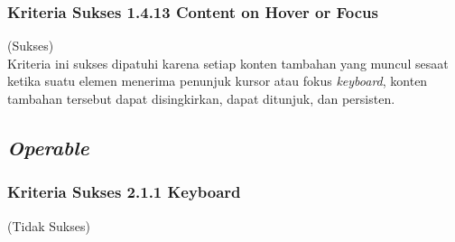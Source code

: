 \documentclass[a4paper,twoside]{article}
\begin{document}
\begin{enumerate}
		\subsubsection*{Kriteria Sukses 1.4.13 Content on Hover or Focus}
		\label{subsubsec:kepatuhan_kriteria_1.4.13}
		(Sukses) \\
		
		Kriteria ini sukses dipatuhi karena setiap konten tambahan yang muncul sesaat ketika suatu elemen menerima penunjuk kursor atau fokus \textit{keyboard}, konten tambahan tersebut dapat disingkirkan, dapat ditunjuk, dan persisten.
		
		\subsection*{\textit{Operable}}
		\label{subsec:kepatuhan_operable}
		
		\subsubsection*{Kriteria Sukses 2.1.1 Keyboard}
		\label{subsubsec:kepatuhan_kriteria_2.1.1}
		(Tidak Sukses) \\
		

\end{enumerate}
\end{document}
